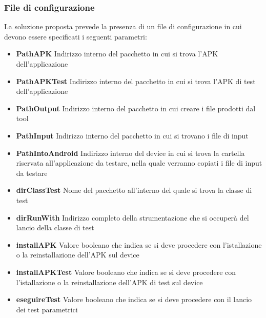 \subsubsection{File di configurazione}
La soluzione proposta prevede la presenza di un file di configurazione in cui devono essere specificati i seguenti parametri:
\begin{itemize} [nosep]
\item[]\textbf{PathAPK} \newline
Indirizzo interno del pacchetto in cui si trova l'APK dell'applicazione
\item []\textbf{PathAPKTest} \newline
Indirizzo interno del pacchetto in cui si trova l'APK di test dell'applicazione
\item[] \textbf{PathOutput} \newline
Indirizzo interno del pacchetto in cui creare i file prodotti dal tool
\item[] \textbf{PathInput} \newline
Indirizzo interno del pacchetto in cui si trovano i file di input
\item[] \textbf{PathIntoAndroid} \newline
Indirizzo interno del device in cui si trova la cartella riservata all’applicazione da testare, nella quale verranno copiati i file di input da testare
\item []\textbf{dirClassTest} \newline
Nome del pacchetto all’interno del quale si trova la classe di test
\item[] \textbf{dirRunWith} \newline
Indirizzo completo della strumentazione che si occuperà del lancio della
classe di test 
\item []\textbf{installAPK} \newline
Valore booleano che indica se si deve procedere con l’istallazione
o la reinstallazione dell’APK sul device
\item[] \textbf{installAPKTest} \newline
Valore booleano che indica se si deve procedere con l’istallazione
o la reinstallazione dell’APK di test sul device
\item[] \textbf{eseguireTest} \newline
Valore booleano che indica se si deve procedere con il lancio dei test parametrici
\end{itemize}


